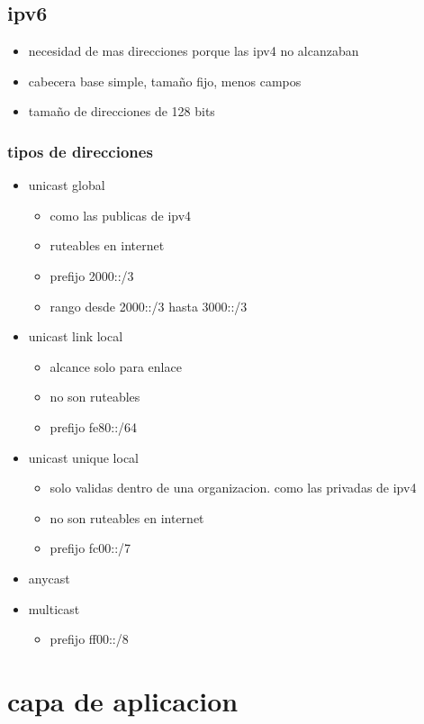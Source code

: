 \documentclass[11pt]{article}
\begin{document}
\subsection{ipv6}
\label{sec:org1b0a9fa}
\begin{itemize}
\item necesidad de mas direcciones porque las ipv4 no alcanzaban
\item cabecera base simple, tamaño fijo, menos campos
\item tamaño de direcciones de 128 bits
\end{itemize}
\subsubsection{tipos de direcciones}
\label{sec:orgd7d3880}
\begin{itemize}
\item unicast global
\begin{itemize}
\item como las publicas de ipv4
\item ruteables en internet
\item prefijo 2000::/3
\item rango desde 2000::/3 hasta 3000::/3
\end{itemize}
\item unicast link local
\begin{itemize}
\item alcance solo para enlace
\item no son ruteables
\item prefijo fe80::/64
\end{itemize}
\item unicast unique local
\begin{itemize}
\item solo validas dentro de una organizacion. como las privadas de ipv4
\item no son ruteables en internet
\item prefijo fc00::/7
\end{itemize}
\item anycast
\item multicast
\begin{itemize}
\item prefijo ff00::/8
\end{itemize}
\end{itemize}
\section{capa de aplicacion}
\label{sec:orgcb34a80}
\end{document}
